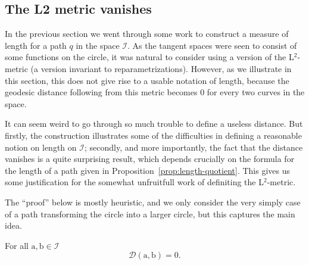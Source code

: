 \message{ !name(mainfile.tex)}\documentclass[a4,danish]{article}
\begin{document}
\subsection{The L2 metric vanishes}
\label{sec:l2-metric-vanishes}

In the previous section we went through some work to construct a measure of length for a path $q$ in the space $\mathcal{I}$. As the tangent spaces were seen to consist of some functions on the circle, it was natural to consider using a version of the L$^2$-metric (a version invariant to reparametrizations). However, as we illustrate in this section, this does not give rise to a usable notation of length, because the geodesic distance following from this metric becomes 0 for every two curves in the space.

It can seem weird to go through so much trouble to define a useless distance. But firstly, the construction illustrates some of the difficulties in defining a reasonable notion on length on $\mathcal{I}$; secondly, and more importantly, the fact that the distance vanishes is a quite surprising result, which depends crucially on the formula for the length of a path given in Proposition~\ref{prop:length-quotient}. This gives us some justification for the somewhat unfruitfull work of definiting the L$^2$-metric.

The ``proof'' below is mostly heuristic, and we only consider the very simply case of a path transforming the circle into a larger circle, but this captures the main idea.
\begin{theorem}
  \label{theorem:l2-metric-vanishes}
  For all $\mathrm{a},\mathrm{b} \in \mathcal{I}$
  \begin{equation*}
    \mathcal{D}(\mathrm{a},\mathrm{b}) = 0.
  \end{equation*}
\end{theorem}
\end{document}
